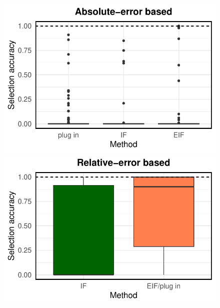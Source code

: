 \documentclass[twoside]{article}
\newcommand{\1}{{\mathbbm{1}}}
\begin{document}
\begin{figure}[ht]
\centering
        \begin{minipage}{0.23\textwidth}
                \centering
                \includegraphics[clip, trim = 0cm 0cm 0cm 0cm, width = \textwidth]{plot/ACIC_linear_propensity_linear_HTE_selection_accuracy_absolute_error.pdf}
        \end{minipage}
            \begin{minipage}{0.23\textwidth}
                \centering
                \includegraphics[clip, trim = 0cm 0cm 0cm 0cm, width = \textwidth]{plot/ACIC_linear_propensity_linear_HTE_selection_accuracy_relative_error.pdf}
        \end{minipage}
         \\
                \begin{minipage}{0.23\textwidth}

\end{minipage}
\end{figure}
\end{document}
